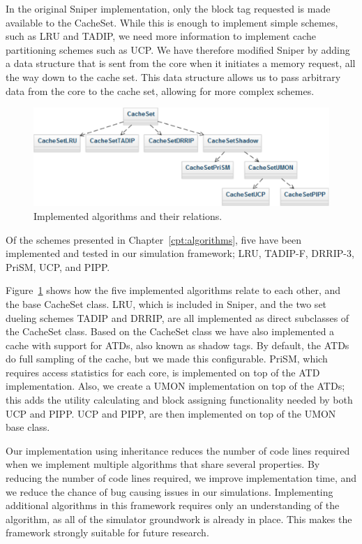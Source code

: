 In the original Sniper implementation, only the block tag requested is made available to the CacheSet. 
While this is enough to implement simple schemes, such as LRU and TADIP, we need more information to implement cache partitioning schemes such as UCP.
We have therefore modified Sniper by adding a data structure that is sent from the core when it initiates a memory request, all the way down to the cache set.
This data structure allows us to pass arbitrary data from the core to the cache set, allowing for more complex schemes.

\begin{figure}[ht]
\centering
\includegraphics[scale=0.7]{figures/framework/algorithms}
\caption{Implemented algorithms and their relations.}
\label{fig:framework:implementation:algorithms}
\end{figure}

Of the schemes presented in Chapter~\ref{cpt:algorithms}, five have been implemented and tested in our simulation framework; LRU, TADIP-F, DRRIP-3, PriSM, UCP, and PIPP.

Figure~\ref{fig:framework:implementation:algorithms} shows how the five implemented algorithms relate to each other, and the base CacheSet class.
LRU, which is included in Sniper, and the two set dueling schemes TADIP and DRRIP, are all implemented as direct subclasses of the CacheSet class.
Based on the CacheSet class we have also implemented a cache with support for ATDs, also known as shadow tags.
By default, the ATDs do full sampling of the cache, but we made this configurable.
PriSM, which requires access statistics for each core, is implemented on top of the ATD implementation.
Also, we create a UMON implementation on top of the ATDs; this adds the utility calculating and block assigning functionality needed by both UCP and PIPP.
UCP and PIPP, are then implemented on top of the UMON base class.

Our implementation using inheritance reduces the number of code lines required when we implement multiple algorithms that share several properties.
By reducing the number of code lines required, we improve implementation time, and we reduce the chance of bug causing issues in our simulations.
Implementing additional algorithms in this framework requires only an understanding of the algorithm, as all of the simulator groundwork is already in place.
This makes the framework strongly suitable for future research.
